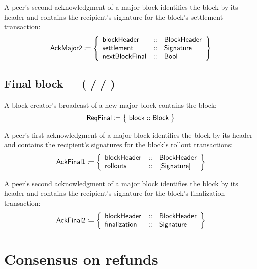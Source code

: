 \documentclass[../hydrozoa.tex]{subfiles}
\begin{document}
A peer's second acknowledgment of a major block identifies the block by its header and contains the recipient's signature for the block's settlement transaction:
\begin{equation*}
  \mathsf{AckMajor2} \coloneq \left\{
  \begin{array}{lll}
    \mathsf{blockHeader} &::& \mathsf{BlockHeader} \\
    \mathsf{settlement} &::& \mathsf{Signature} \\
    \mathsf{nextBlockFinal} &::& \mathsf{Bool}
  \end{array}\right\}
\end{equation*}

\subsection{Final block~~~( /  / )}%
\label{h:l2-consensus-final-block}%

A block creator's broadcast of a new major block contains the block;
\begin{equation*}
  \mathsf{ReqFinal} \coloneq \;\bigr\{\; \mathsf{block} :: \mathsf{Block} \;\bigr\}
\end{equation*}

A peer's first acknowledgment of a major block identifies the block by its header and contains the recipient's signatures for the block's rollout transactions:
\begin{equation*}
  \mathsf{AckFinal1} \coloneq \left\{
  \begin{array}{lll}
    \mathsf{blockHeader} &::& \mathsf{BlockHeader} \\
    \mathsf{rollouts} &::& [\mathsf{Signature}]
  \end{array}\right\}
\end{equation*}

A peer's second acknowledgment of a major block identifies the block by its header and contains the recipient's signature for the block's finalization transaction:
\begin{equation*}
  \mathsf{AckFinal2} \coloneq \left\{
  \begin{array}{lll}
    \mathsf{blockHeader} &::& \mathsf{BlockHeader} \\
    \mathsf{finalization} &::& \mathsf{Signature}
  \end{array}\right\}
\end{equation*}

\section{Consensus on refunds}%
\label{h:l2-consensus-on-refunds}%
\end{document}
